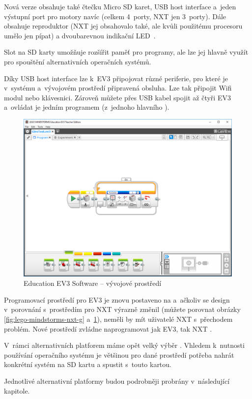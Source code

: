 
Nová verze obsahuje také čtečku Micro SD karet, USB host interface a~jeden výstupní port pro motory navíc (celkem 4~porty, NXT jen 3~porty). Dále obsahuje reproduktor (NXT jej obsahovalo také, ale kvůli použitému procesoru umělo jen pípat) a dvoubarevnou indikační LED~\cite{legoBotBench_comparing-EV3-and-NXT}. 

Slot na SD karty umožňuje rozšířit paměť pro programy, ale lze jej hlavně využít pro spouštění alternativních operačních systémů. 

Díky USB host interface lze k~EV3 připojovat různé periferie, pro které je v~systému a~vývojovém prostředí připravená obsluha.
Lze tak připojit Wifi modul nebo klávesnici. 
Zároveň můžete přes USB kabel spojit až čtyři EV3  a~ovládat je jedním programem (z~jednoho hlavního ).

\begin{figure}[h]
	\centering
	\includegraphics[width=\textwidth]{images/lego-mindstorms-ev3_dev-soft.png}
	\caption[\legoM{ }Education EV3 Software -- vývojové prostředí]{\legoM{ }Education EV3 Software -- vývojové prostředí}
	\label{fig:lego-mindstorms-ev3_dev-soft}
\end{figure}

Programovací prostředí pro EV3 je znovu postaveno na \labview{ }a~ačkoliv se design v~porovnání s~prostředím pro NXT výrazně změnil (můžete porovnat obrázky \ref{fig:lego-mindstorms-nxt-g} a~\ref{fig:lego-mindstorms-ev3_dev-soft}), neměli by mít uživatelé NXT s~přechodem problém. 
Nové prostředí zvládne naprogramovat jak EV3, tak NXT \brick{}.

V~rámci alternativních platforem máme opět velký výběr \cite{legoMindstormsWikipedia_programming-languages}. 
Vhledem k~nutnosti používání operačního systému je většinou pro dané prostředí potřeba nahrát konkrétní systém na SD kartu a spustit \brick{ }s~touto kartou.

Jednotlivé alternativní platformy budou podrobněji probrány v~následující kapitole.
